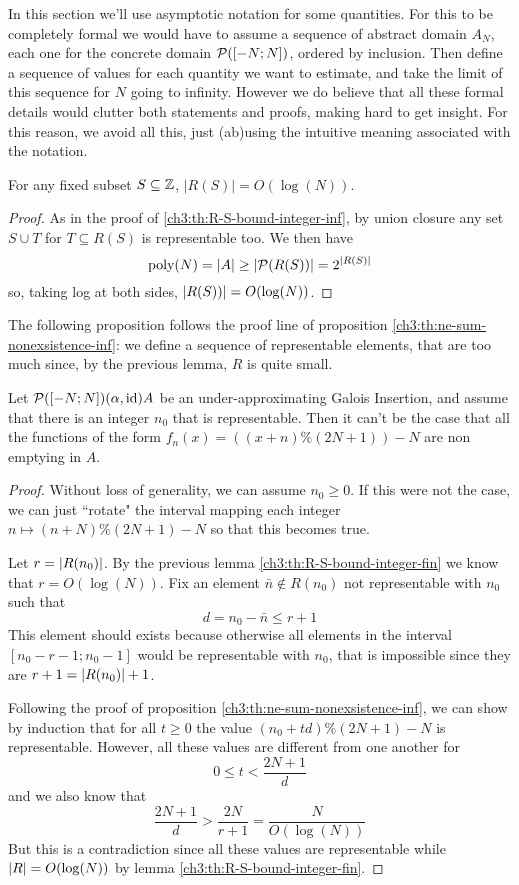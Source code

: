 In this section we'll use asymptotic notation for some quantities. For this to be completely formal we would have to assume a sequence of abstract domain $A_N$, each one for the concrete domain $\mathcal{P}([-N; N])$, ordered by inclusion. Then define a sequence of values for each quantity we want to estimate, and take the limit of this sequence for $N$ going to infinity. However we do believe that all these formal details would clutter both statements and proofs, making hard to get insight. For this reason, we avoid all this, just (ab)using the intuitive meaning associated with the notation.

\begin{lemma}\label{ch3:th:R-S-bound-integer-fin}
	For any fixed subset $S \subseteq \mathbb{Z}$, $\lvert R(S) \rvert = O(\log(N))$.
\end{lemma}
\begin{proof}
	As in the proof of \ref{ch3:th:R-S-bound-integer-inf}, by union closure any set $S \cup T$ for $T \subseteq R(S)$ is representable too. We then have
	\[
	\text{poly}(N) = \lvert A\rvert \ge \lvert\mathcal{P}(R(S))\rvert = 2^{\lvert R(S)\rvert} 
	\]
	so, taking log at both sides, $\lvert R(S))\rvert = O(\log(N))$.
\end{proof}

The following proposition follows the proof line of proposition \ref{ch3:th:ne-sum-nonexsistence-inf}: we define a sequence of representable elements, that are too much since, by the previous lemma, $R$ is quite small.

\begin{prop}\label{ch3:th:ne-sum-nonexsistence-fin}
	Let $\mathcal{P}([-N; N]) (\alpha, \text{id}) A$ be an under-approximating Galois Insertion, and assume that there is an integer $n_0$ that is representable. Then it can't be the case that all the functions of the form $f_n(x) = ((x + n) \% (2N + 1)) - N$ are non emptying in $A$.
\end{prop}
\begin{proof}
	Without loss of generality, we can assume $n_0 \ge 0$. If this were not the case, we can just ``rotate" the interval mapping each integer $n \mapsto (n + N) \% (2N + 1) - N$ so that this becomes true.

	Let $r = \lvert R(n_0)\rvert$. By the previous lemma \ref{ch3:th:R-S-bound-integer-fin} we know that $r = O(\log(N))$. Fix an element $\bar{n} \notin R(n_0)$ not representable with $n_0$ such that
	\[
	d = n_0 - \bar{n} \le r + 1
	\]
	This element should exists because otherwise all elements in the interval $[n_0 - r - 1; n_0 - 1]$ would be representable with $n_0$, that is impossible since they are $r + 1 = \lvert R(n_0)\rvert + 1$.

	Following the proof of proposition \ref{ch3:th:ne-sum-nonexsistence-inf}, we can show by induction that for all $t \ge 0$ the value $(n_0 + t d) \% (2N + 1) - N$ is representable. However, all these values are different from one another for
	\[
	0 \le t < \frac{2N + 1}{d}
	\]
	and we also know that
	\[
	\frac{2N + 1}{d} > \frac{2N}{r + 1} = \frac{N}{O(\log(N))}
	\]
	But this is a contradiction since all these values are representable while $\lvert R\rvert = O(\log(N))$ by lemma \ref{ch3:th:R-S-bound-integer-fin}.
\end{proof}
